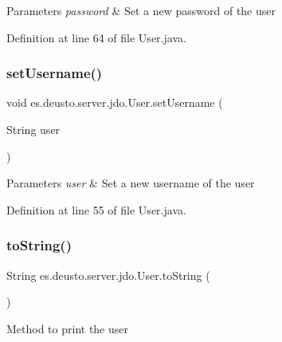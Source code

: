 \begin{DoxyParams}{Parameters}
{\em password} & Set a new password of the user \\
\hline
\end{DoxyParams}


Definition at line 64 of file User.\+java.

\mbox{\label{classes_1_1deusto_1_1server_1_1jdo_1_1_user_a50b19b7520eb089012413d6072c1b7a2}} 
\subsubsection{\texorpdfstring{set\+Username()}{setUsername()}}
{\footnotesize\ttfamily void es.\+deusto.\+server.\+jdo.\+User.\+set\+Username (\begin{DoxyParamCaption}\item[{String}]{user }\end{DoxyParamCaption})}


\begin{DoxyParams}{Parameters}
{\em user} & Set a new username of the user \\
\hline
\end{DoxyParams}


Definition at line 55 of file User.\+java.

\mbox{\label{classes_1_1deusto_1_1server_1_1jdo_1_1_user_a65366a578a6dcc53e3a77d6eabbbf8cf}} 
\subsubsection{\texorpdfstring{to\+String()}{toString()}}
{\footnotesize\ttfamily String es.\+deusto.\+server.\+jdo.\+User.\+to\+String (\begin{DoxyParamCaption}{ }\end{DoxyParamCaption})}

Method to print the user 

